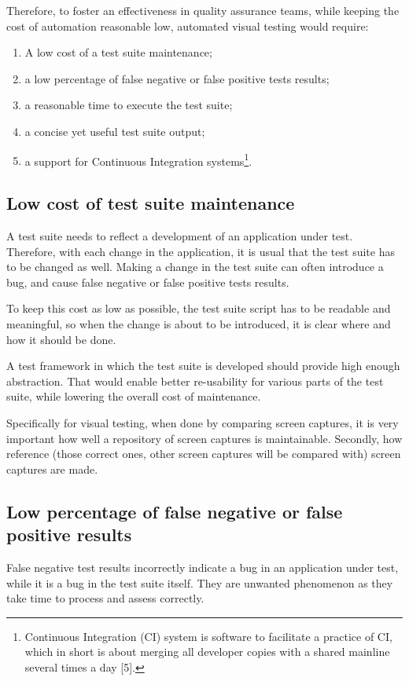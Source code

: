 \documentclass[11pt,oneside,final]{fithesis2}
\begin{document}
  Therefore, to foster an effectiveness in quality assurance teams, while keeping the cost of automation reasonable low, automated visual testing would require:
  \begin{enumerate}
   \item A low cost of a test suite maintenance;
   \item a low percentage of false negative or false positive tests results;
   \item a reasonable time to execute the test suite;
   \item a concise yet useful test suite output;
   \item a support for Continuous Integration systems\footnote{Continuous Integration (CI) system is software to facilitate a practice of CI, which in short is about merging 
	  all developer copies with a shared mainline several times a day [5].}.
  \end{enumerate}
  
    \subsection{Low cost of test suite maintenance}
    A test suite needs to reflect a development of an application under test. Therefore, with each change in the application, it is usual that the test suite has to be changed as well.
    Making a change in the test suite can often introduce a bug, and cause false negative or false positive tests results.
    
    To keep this cost as low as possible, the test suite script has to be readable and meaningful, so when the change is about to be introduced, it is clear where and how it should be done.
    
    A test framework in which the test suite is developed should provide high enough abstraction. That would enable better re-usability for various parts of the test suite, 
    while lowering the overall cost of maintenance.
    
    Specifically for visual testing, when done by comparing screen captures, it is very important how well a repository of screen captures is maintainable. Secondly, 
    how reference (those correct ones, other screen captures will be compared with) screen captures are made.
    
    \subsection{Low percentage of false negative or false positive results}
    False negative test results incorrectly indicate a bug in an application under test, while it is a bug in the test suite itself. They are unwanted phenomenon as they take time to process
    and assess correctly.
    
\end{document}
